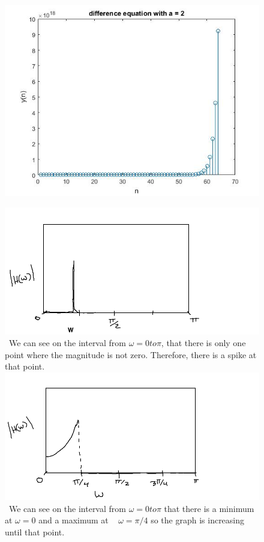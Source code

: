 \documentclass{article}
\begin{document}
\begin{figure}[H]

\includegraphics[scale = .5]{report3}
\end{figure}

\begin{figure}[H]
\includegraphics[scale = .5]{report4_1}
\ We can see on the interval from $\omega = 0 to \pi$, that there is only one point where the magnitude is not zero. Therefore, there is a spike at that point.
\includegraphics[scale = .5]{report4_2}
\ We can see on the interval from $\omega = 0 to \pi $ that there is a minimum at $\omega = 0$ and a maximum at ~ $\omega = \pi/4$ so the graph is increasing until that point.
\end{figure}
\end{document}
